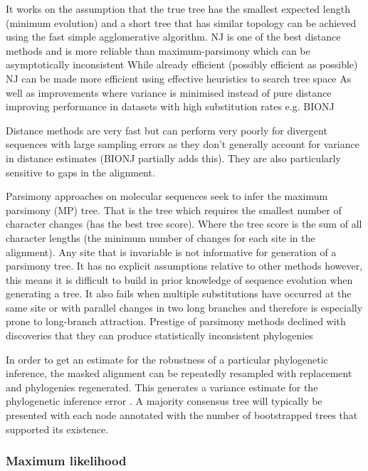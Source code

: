It works on the assumption that the true tree has the smallest expected length (minimum evolution) and a short tree that has similar topology can be achieved using the 
fast simple agglomerative algorithm.  NJ is one of the best distance methods and 
is more reliable than maximum-parsimony which can be asymptotically inconsistent
While already efficient (possibly efficient as possible) NJ can be made more efficient 
using effective heuristics to search tree space \citep{Kumar1996}
As well as improvements where variance is minimised instead of pure distance improving performance in datasets with high
substitution rates e.g. BIONJ \citep{Gascuel1997}

Distance methods are very fast but can perform
very poorly for divergent sequences with large sampling errors as they don't generally account for variance in 
distance estimates \citep{Yang2012} (BIONJ partially adds this).  They are also
particularly sensitive to gaps in the alignment.



Parsimony approaches \citep{Camin1965} on molecular sequences \citep{Eck1966} seek to infer the maximum parsimony (MP) tree.
That is the tree which requires the smallest number of character changes (has the best tree score).  Where the tree score is the sum of 
all character lengths (the minimum number of changes for each site in the alignment).  Any site that is invariable is not
informative for generation of a parsimony tree.
It has no explicit assumptions relative to other methods however, this means it is difficult to build in 
prior knowledge of sequence evolution when generating a tree.
It also fails when multiple substitutions have occurred at the same site or with parallel changes in two long branches 
and therefore is especially prone to long-branch attraction.
\citep{Felsenstein1978}
Prestige of parsimony methods declined with discoveries that they can produce statistically inconsistent
phylogenies \citep{Felsenstein2001}


In order to get an estimate for the robustness of a particular phylogenetic
inference, the masked alignment can be repeatedly resampled with replacement
and phylogenies regenerated.  This generates a variance estimate for the 
phylogenetic inference error \citep{Felsenstein1985}.
A majority consensus tree will typically be presented with each node
annotated with the number of bootstrapped trees that supported its existence.

\subsubsection{Maximum likelihood}

